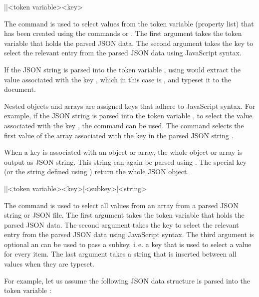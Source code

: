 \documentclass[a4paper]{article}
\begin{document}
{{\begin{macrodef}
|\JSONParseGetValue|{<token variable>}{<key>}
\end{macrodef}
The command \macro{\JSONParseGetValue} is used to select values from the token variable (property list) that has been created using the commands \macro{\JSONParse} or \macro{\JSONParseFromFile}. The first argument takes the token variable that holds the parsed JSON data. The second argument takes the key to select the relevant entry from the parsed JSON data using JavaScript syntax.

If the JSON string  is parsed into the token variable \macro{\myJSONdata}, using  would extract the value associated with the key , which in this case is , and typeset it to the document.

Nested objects and arrays are assigned keys that adhere to JavaScript syntax. For example, if the JSON string  is parsed into the token variable \macro{\myJSONdata}, to select the value associated with the key , the command  can be used. The command  selects the first value of the array associated with the key  in the parsed JSON string .

When a key is associated with an object or array, the whole object or array is output as JSON string. This string can again be parsed using \macro{\JSONParse}. The special key  (or the string defined using \macro{\JSONParseSetChildSeparator}) return the whole JSON object.

\begin{macrodef}
|\JSONParseGetArrayValues|{<token variable>}{<key>}[<subkey>]{<string>}
\end{macrodef}
The command \macro{\JSONParseGetArrayValues} is used to select all values from an array from a parsed JSON string or JSON file. The first argument takes the token variable that holds the parsed JSON data. The second argument takes the key to select the relevant entry from the parsed JSON data using JavaScript syntax. The third argument is optional an can be used to pass a subkey, i.\,e. a key that is used to select a value for every item. The last argument takes a string that is inserted between all values when they are typeset.

For example, let us assume the following JSON data structure is parsed into the token variable \macro{\myJSONdata}:

}}
\end{document}

